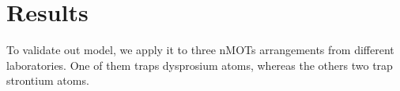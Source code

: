%
\chapter{Results}
\label{ch:results}
% 

To validate out model, we apply it to three nMOTs arrangements from different laboratories. One of them traps dysprosium atoms, whereas the others two trap strontium atoms.


%


%
